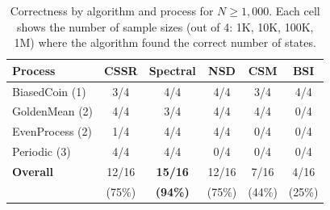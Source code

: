 \begin{table}[htbp]
\centering
\begin{tabular}{lccccc}
\toprule
\textbf{Process} & \textbf{CSSR} & \textbf{Spectral} & \textbf{NSD} & \textbf{CSM} & \textbf{BSI} \\
\midrule
BiasedCoin (1) & 3/4 & 4/4 & 4/4 & 3/4 & 4/4 \\
GoldenMean (2) & 4/4 & 3/4 & 4/4 & 4/4 & 0/4 \\
EvenProcess (2) & 1/4 & 4/4 & 4/4 & 0/4 & 0/4 \\
Periodic (3) & 4/4 & 4/4 & 0/4 & 0/4 & 0/4 \\
\midrule
\textbf{Overall} & 12/16 & \textbf{15/16} & 12/16 & 7/16 & 4/16 \\
  & (75\%) & \textbf{(94\%)} & (75\%) & (44\%) & (25\%) \\
\bottomrule
\end{tabular}
\caption{Correctness by algorithm and process for $N \geq 1{,}000$. Each cell shows the number of sample sizes (out of 4: 1K, 10K, 100K, 1M) where the algorithm found the correct number of states.}
\label{tab:correctness}
\end{table}
